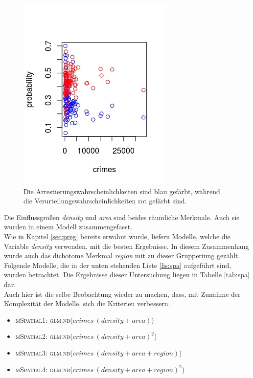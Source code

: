\begin{figure}
\centering
\includegraphics[scale=0.7]{./jpgs/prvc.jpeg}
\caption[Vergleich Wahrscheinlichkeiten in Counties]{Die Arrestierungswahrscheinlichkeiten sind blau gef\"arbt, w\"ahrend die Verurteilungswahrscheinlichkeiten rot gef\"arbt sind.}
\label{fig:nbd}
\end{figure}


\par\smallskip
Die Einflussgr\"o\ss{}en \textit{density} und \textit{area} sind beides r\"aumliche Merkmale. Auch sie wurden in einem Modell zusammengefasst. \\
Wie in Kapitel \ref{sec:preg} bereits erw\"ahnt wurde, liefern Modelle, welche die Variable \textit{density} verwenden, mit die besten Ergebnisse.
In diesem Zusammenhang wurde auch das dichotome Merkmal \textit{region} mit zu dieser Grupperiung gez\"ahlt. \\
Folgende Modelle, die in der unten stehenden Liste \ref{lis:spa} aufgef\"uhrt sind, wurden betrachtet.
Die Ergebnisse dieser Untersuchung liegen in Tabelle \ref{tab:spa} dar. \\
Auch hier ist die selbe Beobachtung wieder zu machen, dass, mit Zunahme der Komplexit\"at der Modelle, sich die Kriterien verbessern.

\begin{itemize}
\item \textsc{mSpatial1: glm.nb($crimes~(density+area)$)}
\item \textsc{mSpatial2: glm.nb($crimes~(density+area)^2$)}
\item \textsc{mSpatial3: glm.nb($crimes~(density+area+region)$)}
\item \textsc{mSpatial4: glm.nb($crimes~(density+area+region)^2$)}
\label{lis:spa}
\end{itemize}

